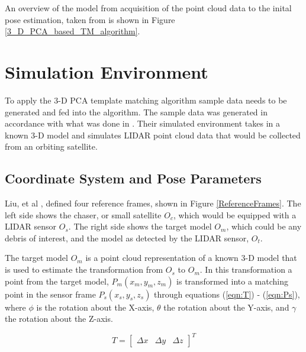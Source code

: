 \documentclass[conference]{IEEEtran}
\begin{document}
		An overview of the model from acquisition of the point cloud data to the inital pose estimation, taken from \cite{2017_pose_pca} is shown in Figure \ref{3_D_PCA_based_TM_algorithm}.


	\section{Simulation Environment}
		To apply the 3-D PCA template matching algorithm sample data needs to be generated and fed into the algorithm. The sample data was generated in accordance with what was done in \cite{liu2016point}. Their simulated environment takes in a known 3-D model and simulates LIDAR point cloud data that would be collected from an orbiting satellite.


	\subsection{Coordinate System and Pose Parameters}
		Liu, et al \cite{liu2016point}, defined four reference frames, shown in Figure \ref{ReferenceFrames}. The left side shows the chaser, or small satellite $O_c$, which would be equipped with a LIDAR sensor $O_s$. The right side shows the target model $O_m$, which could be any debris of interest, and the model as detected by the LIDAR sensor, $O_t$.
		
		The target model $O_m$ is a point cloud representation of a known 3-D model that is used to estimate the transformation from $O_s$ to $O_m$. In this transformation a point from the target model, $P_m (x_m,y_m,z_m)$ is transformed into a matching point in the sensor frame $P_s (x_s,y_s,z_s)$ through equations (\ref{eqn:T}) - (\ref{eqn:Ps}), where $\phi$ is the rotation about the X-axis, $\theta$ the rotation about the Y-axis, and $\gamma$ the rotation about the Z-axis. 
		
		\begin{equation}
			\label{eqn:T}
			T = \begin{bmatrix} \Delta x  & \Delta y & \Delta z \end{bmatrix}^T
		\end{equation}
\end{document}
